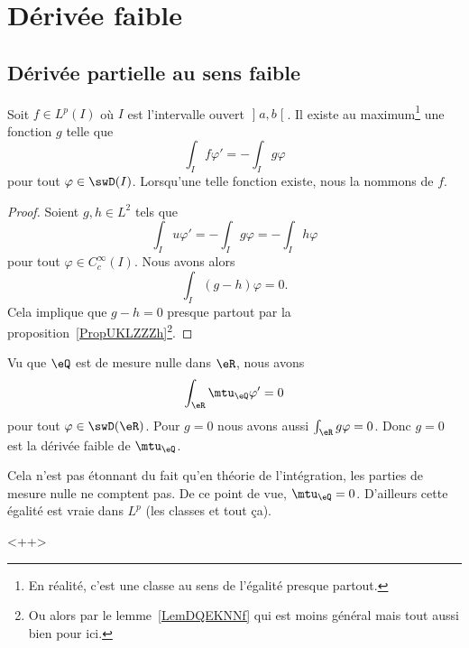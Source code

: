 \section{Dérivée faible}

\subsection{Dérivée partielle au sens faible}

\begin{lemmaDef}        \label{DEFooIRJQooMVNopl}
    Soit \( f\in L^p(I)\) où \( I\) est l'intervalle ouvert \( \mathopen] a , b \mathclose[\). Il existe au maximum\footnote{En réalité, c'est une classe au sens de l'égalité presque partout.} une fonction \( g\) telle que 
    \begin{equation}
        \int_If\varphi'=-\int_Ig\varphi
    \end{equation}
    pour tout \( \varphi\in \swD(I)   \). Lorsqu'une telle fonction existe, nous la nommons  de \( f\).
\end{lemmaDef}

\begin{proof}
    Soient \( g,h\in L^2\) tels que
    \begin{equation}
        \int_Iu\varphi'=-\int_Ig\varphi=-\int_Ih\varphi
    \end{equation}
    pour tout \( \varphi\in C^{\infty}_c(I)\). Nous avons alors
    \begin{equation}
        \int_I(g-h)\varphi=0.
    \end{equation}
    Cela implique que \( g-h=0\) presque partout par la proposition~\ref{PropUKLZZZh}\footnote{Ou alors par le lemme~\ref{LemDQEKNNf} qui est moins général mais tout aussi bien pour ici.}.
\end{proof}

\begin{example}
    Vu que \( \eQ\) est de mesure nulle dans \( \eR\), nous avons
    \begin{equation}
        \int_{\eR}\mtu_{\eQ}\varphi'=0
    \end{equation}
    pour tout \( \varphi\in\swD(\eR)\). Pour \( g=0\) nous avons aussi \( \int_{\eR}g\varphi=0\). Donc \( g=0\) est la dérivée faible de \( \mtu_{\eQ}\).

    Cela n'est pas étonnant du fait qu'en théorie de l'intégration, les parties de mesure nulle ne comptent pas. De ce point de vue, \( \mtu_{\eQ}=0\). D'ailleurs cette égalité est vraie dans \( L^p\) (les classes et tout ça).
\end{example}
<++>

